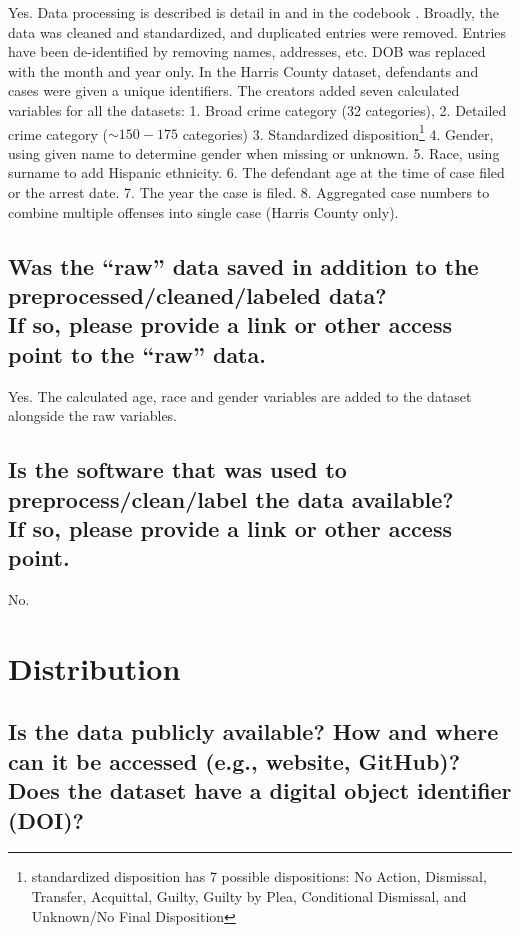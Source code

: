 \documentclass[letterpaper, 10 pt, conference]{ieeeconf}  %
\newcommand{\subtitle}[1]{{\\ \small \normalfont \color{purple} #1}}
\begin{document}
Yes. Data processing is described is detail in \cite{ormachea2015new} and in the codebook \cite{Neulaw}. Broadly, the data was cleaned and standardized, and duplicated entries were removed. Entries have been de-identified by removing names, addresses, etc. DOB was replaced with the month and year only. In the Harris County dataset, defendants and cases were given a unique identifiers. The creators added seven calculated variables for all the datasets: 
1. Broad crime category (32 categories), 
2. Detailed crime category ($\sim 150-175$ categories)
3. Standardized disposition\footnote{standardized disposition has 7 possible dispositions: No Action, Dismissal, Transfer, Acquittal, Guilty, Guilty by Plea, Conditional Dismissal, and Unknown/No Final Disposition}
4. Gender, using given name to determine gender when missing or unknown.
5. Race, using surname to add Hispanic ethnicity.
6. The defendant age at the time of case filed or the arrest date.
7. The year the case is filed.
8. Aggregated case numbers to combine multiple offenses into single case (Harris County only).

\subsection{Was the “raw” data saved in addition to the preprocessed/cleaned/labeled data? \subtitle{If so, please provide a link or other access point to the “raw” data. }}

Yes. The calculated age, race and gender variables are added to the dataset alongside the raw variables. 

\subsection{Is the software that was used to preprocess/clean/label the data available? \subtitle{If so, please provide a link or other access point.}}

No.

\section{Distribution}


\subsection{Is the data publicly available? How and where can it be accessed (e.g., website, GitHub)? \subtitle{Does the dataset have a digital object identifier (DOI)?}}
\end{document}

